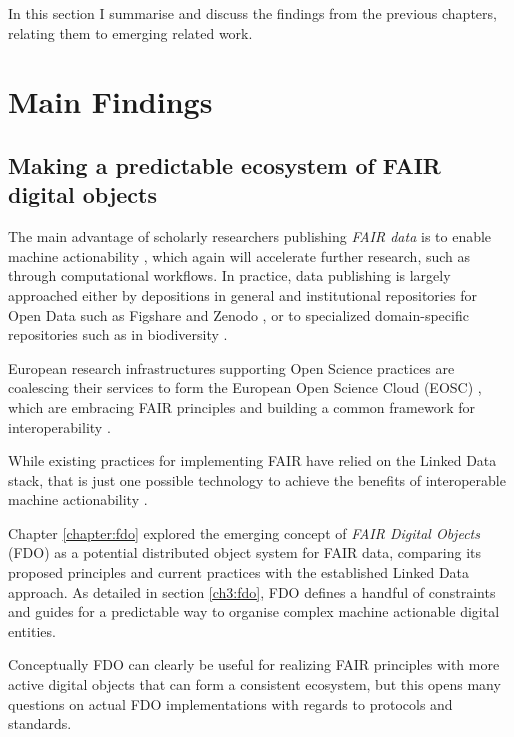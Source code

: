 In this section I summarise and discuss the findings from the previous chapters, relating them to emerging related work. 



\section{Main Findings}

\subsection{Making a predictable ecosystem of FAIR digital objects}

The main advantage of scholarly researchers publishing \emph{FAIR data} is to enable machine actionability \cite{Wilkinson 2016}, which again will accelerate further research, such as through computational workflows. 
In practice, data publishing is largely approached either by depositions in general and institutional repositories for Open Data such as Figshare and Zenodo \cite{Dillen 2019}, or to specialized domain-specific repositories such as in biodiversity \cite{ch8-7}. 

European research infrastructures supporting Open Science practices are coalescing their services to form the European Open Science Cloud (EOSC) \cite{10.2777/940154}, which are embracing FAIR principles \cite{Mons 2017} and building a common framework for interoperability \cite{eosc-interop-framework}. 

While existing practices for implementing FAIR have relied on the Linked Data stack, that is just one possible technology to achieve the benefits of interoperable machine actionability \cite{Mons 2017}. 

Chapter \ref{chapter:fdo} explored the emerging concept of \emph{FAIR Digital Objects} (FDO) \cite{Schultes 2019} as a potential distributed object system for FAIR data, comparing its proposed principles and current practices with the established Linked Data approach. 
As detailed in section \vref{ch3:fdo}, FDO defines a handful of constraints and guides for a predictable way to organise complex machine actionable digital entities. 

Conceptually FDO can clearly be useful for realizing FAIR principles with more active digital objects that can form a consistent ecosystem, but this opens many questions on actual FDO implementations with regards to protocols and standards.

